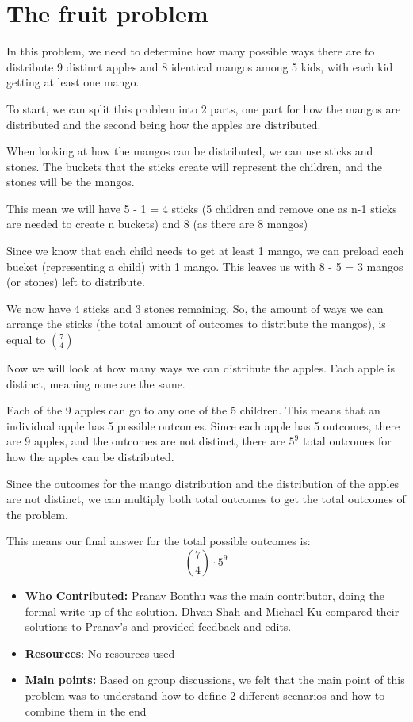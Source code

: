 \documentclass[11pt]{article}
\begin{document}
\section{The fruit problem}

In this problem, we need to determine how many possible ways there are to distribute 9 distinct apples and 8 identical mangos among 5 kids, with each kid getting at least one mango.

To start, we can split this problem into 2 parts, one part for how the mangos are distributed and the second being how the apples are distributed.

When looking at how the mangos can be distributed, we can use sticks and stones. The buckets that the sticks create will represent the children, and the stones will be the mangos.

This mean we will have 5 - 1 = 4 sticks (5 children and remove one as n-1 sticks are needed to create n buckets) and 8 (as there are 8 mangos)

Since we know that each child needs to get at least 1 mango, we can preload each bucket (representing a child) with 1 mango. This leaves us with 8 - 5 = 3 mangos (or stones) left to distribute.

We now have 4 sticks and 3 stones remaining. So, the amount of ways we can arrange the sticks (the total amount of outcomes to distribute the mangos), is equal to  $\binom{7}{4}$

Now we will look at how many ways we can distribute the apples. Each apple is distinct, meaning none are the same.

Each of the 9 apples can go to any one of the 5 children. This means that an individual apple has 5 possible outcomes. Since each apple has 5 outcomes, there are 9 apples, and the outcomes are not distinct, there are $5^9$ total outcomes for how the apples can be distributed.

Since the outcomes for the mango distribution and the distribution of the apples are not distinct, we can multiply both total outcomes to get the total outcomes of the problem. 

This means our final answer for the total possible outcomes is:  $$\binom{7}{4} \cdot  5^9$$


\begin{itemize}
    \item \textbf{Who Contributed:} Pranav Bonthu was the main contributor, doing the formal write-up of the solution. Dhvan Shah and Michael Ku compared their solutions to Pranav's and provided feedback and edits.
    \item \textbf{Resources}: No resources used
    \item \textbf{Main points:} Based on group discussions, we felt that the main point of this problem was to understand how to define 2 different scenarios and how to combine them in the end 
\end{itemize}
\end{document}
